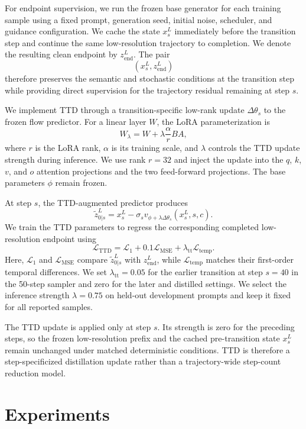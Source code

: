 \documentclass[letterpaper]{article} %
\begin{document}
For endpoint supervision, we run the frozen base generator for each training
sample using a fixed prompt, generation seed, initial noise, scheduler, and
guidance configuration. We cache the state \(x_s^{L}\) immediately before the
transition step and continue the same low-resolution
trajectory to completion. We denote the resulting clean endpoint by
\(z_{\mathrm{end}}^{L}\). The pair
\[
\left(x_s^{L},z_{\mathrm{end}}^{L}\right)
\]
therefore preserves the semantic and stochastic conditions at the
transition step while providing direct supervision for the trajectory
residual remaining at step \(s\).

We implement TTD through a transition-specific low-rank update
\(\Delta\theta_s\) to the frozen flow predictor. For a linear layer \(W\), the
LoRA parameterization is
\[
W_{\lambda}
=
W
+
\lambda\frac{\alpha}{r}BA,
\]
where \(r\) is the LoRA rank, \(\alpha\) is its training scale, and
\(\lambda\) controls the TTD update strength during inference. We use rank
\(r=32\) and inject the update into the \(q\), \(k\), \(v\), and \(o\)
attention projections and the two feed-forward projections. The base
parameters \(\phi\) remain frozen.

At step \(s\), the TTD-augmented predictor produces
\[
\widetilde{z}_{0|s}^{L}
=
x_s^{L}
-
\sigma_s
v_{\phi+\lambda\Delta\theta_s}
(x_s^{L},s,c).
\]
We train the TTD parameters to regress the corresponding completed
low-resolution endpoint using
\[
\mathcal{L}_{\mathrm{TTD}}
=
\mathcal{L}_{1}
+
0.1\mathcal{L}_{\mathrm{MSE}}
+
\lambda_{\mathrm{tt}}\mathcal{L}_{\mathrm{temp}}.
\]
Here, \(\mathcal{L}_{1}\) and \(\mathcal{L}_{\mathrm{MSE}}\) compare
\(\widetilde{z}_{0|s}^{L}\) with \(z_{\mathrm{end}}^{L}\), while
\(\mathcal{L}_{\mathrm{temp}}\) matches their first-order temporal
differences. We set \(\lambda_{\mathrm{tt}}=0.05\) for the earlier
transition at step \(s=40\) in the 50-step sampler and zero for
the later and distilled settings. We select the inference strength
\(\lambda=0.75\) on held-out
development prompts and keep it fixed for all reported samples.

The TTD update is applied only at step \(s\). Its strength is zero for the
preceding steps, so the frozen low-resolution prefix and the cached
pre-transition state \(x_s^{L}\) remain unchanged under matched
deterministic conditions. TTD is therefore a step-specificized distillation update
rather than a trajectory-wide step-count reduction model.

\section{Experiments}
\label{sec:experiments}
\end{document}
